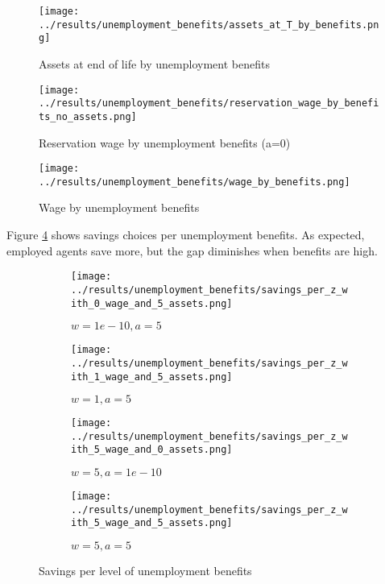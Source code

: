 \documentclass[12pt]{article}
\begin{document}
\begin{figure}[hbt!]
\centering
\texttt{[image: ../results/unemployment\_benefits/assets\_at\_T\_by\_benefits.png]}
\caption{Assets at end of life by unemployment benefits}
\label{fig:assets_at_T_by_benefits}
\end{figure}


\begin{figure}[hbt!]
\centering
\texttt{[image: ../results/unemployment\_benefits/reservation\_wage\_by\_benefits\_no\_assets.png]}
\caption{Reservation wage by unemployment benefits (a=0)}
\label{fig:reservation_wage_by_benefits_no_assets}
\end{figure}


\begin{figure}[hbt!]
\centering
\texttt{[image: ../results/unemployment\_benefits/wage\_by\_benefits.png]}
\caption{Wage by unemployment benefits}
\label{fig:wage_by_benefits}
\end{figure}

\vspace{5mm}
Figure \ref{fig:savings_per_z} shows savings choices per unemployment benefits. As expected, employed agents save more, but the gap diminishes when benefits are high.

\begin{figure}[hbt!]

\begin{subfigure}{0.5\textwidth}
\texttt{[image: ../results/unemployment\_benefits/savings\_per\_z\_with\_0\_wage\_and\_5\_assets.png]} \caption{$w=1e-10, a=5$}
\end{subfigure}%
\begin{subfigure}{0.5\textwidth}
\texttt{[image: ../results/unemployment\_benefits/savings\_per\_z\_with\_1\_wage\_and\_5\_assets.png]}
\caption{$w=1, a=5$}
\end{subfigure}

\begin{subfigure}{0.5\textwidth}
\texttt{[image: ../results/unemployment\_benefits/savings\_per\_z\_with\_5\_wage\_and\_0\_assets.png]} \caption{$w=5, a=1e-10$}
\end{subfigure}%
\begin{subfigure}{0.5\textwidth}
\texttt{[image: ../results/unemployment\_benefits/savings\_per\_z\_with\_5\_wage\_and\_5\_assets.png]}
\caption{$w=5, a=5$}
\end{subfigure}

\caption{Savings per level of unemployment benefits}
\label{fig:savings_per_z}
\end{figure}
\end{document}
